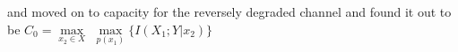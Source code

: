 \documentclass[preview]{standalone}
\begin{document}
\begin{center}
and moved on to capacity for the reversely degraded channel and found it out to be $C_0 = \underset{x_2 \in {X}}{\max}$ $\underset{p(x_1)}{\max} \{I(X_1;Y|x_2)\}$
\end{center}
\end{document}
